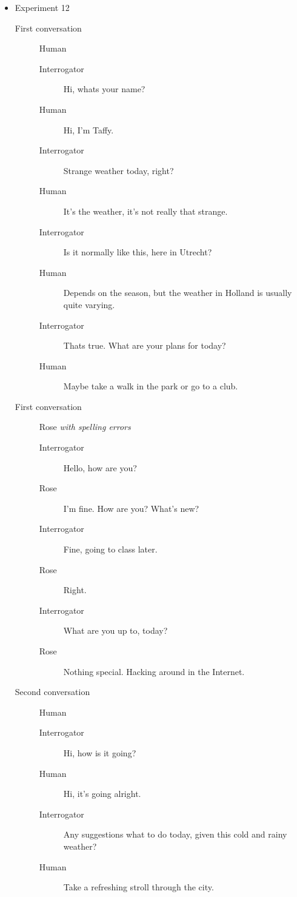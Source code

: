 \begin{itemize}
   \item Experiment 12
      \begin{description}
         \item [First conversation] Human
            \begin{description}
               \item [Interrogator] Hi, whats your name?
               \item [Human] Hi, I'm Taffy.
               \item [Interrogator] Strange weather today, right?
               \item [Human] It's the weather, it's not really that strange.
               \item [Interrogator] Is it normally like this, here in Utrecht?
               \item [Human] Depends on the season, but the weather in Holland is usually quite varying.
               \item [Interrogator] Thats true. What are your plans for today?
               \item [Human] Maybe take a walk in the park or go to a club.
            \end{description}
         \item [First conversation] Rose \textit{with spelling errors}
            \begin{description}
               \item [Interrogator] Hello, how are you?
               \item [Rose] I'm fine. How are you? What's new?
               \item [Interrogator] Fine, going to class later.
               \item [Rose] Right.
               \item [Interrogator] What are you up to, today?
               \item [Rose] Nothing special. Hacking around in the Internet.
            \end{description}
         \item [Second conversation] Human
            \begin{description}
               \item [Interrogator] Hi, how is it going?
               \item [Human] Hi, it's going alright.
               \item [Interrogator] Any suggestions what to do today, given this cold and rainy weather?
               \item [Human] Take a refreshing stroll through the city.

\end{description}
\end{description}
\end{itemize}
